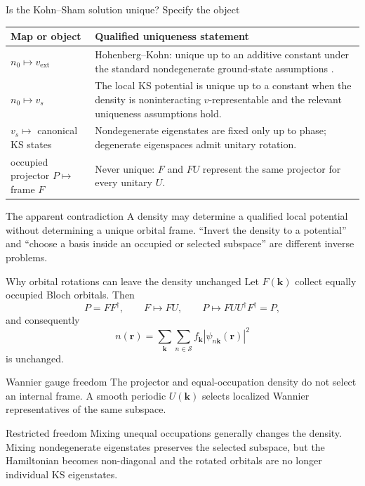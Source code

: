 \documentclass[aspectratio=169,10pt]{beamer}
\begin{document}
\begin{frame}{Is the Kohn--Sham solution unique? Specify the object}
  \small
  \begin{tabular}{p{}p{}}
    \toprule
    Map or object & Qualified uniqueness statement\\
    \midrule
    $n_0\mapsto v_{\mathrm{ext}}$
      & Hohenberg--Kohn: unique up to an additive constant under the standard
        nondegenerate ground-state assumptions \cite{hohenberg1964}.\\[0.6em]
    $n_0\mapsto v_s$
      & The local KS potential is unique up to a constant when the density is
        noninteracting $v$-representable and the relevant uniqueness assumptions hold.\\[0.6em]
    $v_s\mapsto$ canonical KS states
      & Nondegenerate eigenstates are fixed only up to phase; degenerate eigenspaces admit
        unitary rotation.\\[0.6em]
    occupied projector $P\mapsto$ frame $F$
      & Never unique: $F$ and $FU$ represent the same projector for every unitary $U$.\\
    \bottomrule
  \end{tabular}

  \vspace{0.8em}
  \begin{alertblock}{The apparent contradiction}
    A density may determine a qualified local potential without determining a unique
    orbital frame. ``Invert the density to a potential'' and ``choose a basis inside an
    occupied or selected subspace'' are different inverse problems.
  \end{alertblock}
\end{frame}

\begin{frame}{Why orbital rotations can leave the density unchanged}
  \small
  Let $F(\mathbf k)$ collect equally occupied Bloch orbitals. Then
  \[
    P=FF^\dagger,
    \qquad F\mapsto FU,
    \qquad P\mapsto FUU^\dagger F^\dagger=P,
  \]
  and consequently
  \[
    n(\mathbf r)
      =\sum_{\mathbf k}\sum_{n\in\mathcal S}f_{\mathbf k}
       |\psi_{n\mathbf k}(\mathbf r)|^2
  \]
  is unchanged.

  \begin{block}{Wannier gauge freedom}
    The projector and equal-occupation density do not select an internal frame. A smooth
    periodic $U(\mathbf k)$ selects localized Wannier representatives of the same
    subspace.
  \end{block}

  \begin{alertblock}{Restricted freedom}
    Mixing unequal occupations generally changes the density. Mixing nondegenerate
    eigenstates preserves the selected subspace, but the Hamiltonian becomes
    non-diagonal and the rotated orbitals are no longer individual KS eigenstates.
  \end{alertblock}
\end{frame}
\end{document}

